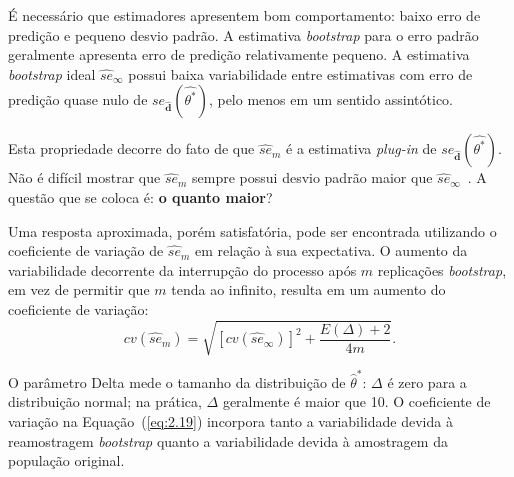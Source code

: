 

É necessário que estimadores apresentem bom comportamento: baixo erro de predição e pequeno desvio padrão. A estimativa \textit{bootstrap} para o erro padrão geralmente apresenta erro de predição relativamente pequeno. A estimativa \textit{bootstrap} ideal $\widehat{se}_{\infty}$ possui baixa variabilidade entre estimativas com erro de predição quase nulo de $se_{\widehat{\textbf{d}}}(\widehat{\theta^*})$, pelo menos em um sentido assintótico.

Esta propriedade decorre do fato de que $\widehat{se}_m$ é a estimativa \textit{plug-in} de $se_{\widehat{\textbf{d}}}(\widehat{\theta^*})$. Não é difícil mostrar que $\widehat{se}_m$ sempre possui desvio padrão maior que $\widehat{se}_{\infty}$~\cite{EFRON:1993}. A questão que se coloca é: \textbf{o quanto maior}?


Uma resposta aproximada, porém satisfatória, pode ser encontrada utilizando o coeficiente de variação de $\widehat{se}_{m}$ em relação à sua expectativa. O aumento da variabilidade decorrente da interrupção do processo após $m$ replicações \textit{bootstrap}, em vez de permitir que $m$ tenda ao infinito, resulta em um aumento do coeficiente de variação:
\begin{equation}
    cv(\widehat{se}_{m}) = \sqrt{[cv(\widehat{se}_\infty)]^2 + \frac{E(\Delta) + 2}{4m}}.
\label{eq:2.19}
\end{equation}

O parâmetro \gls{Delta} mede o tamanho da distribuição de $\widehat{\theta}^*$: $\Delta$ é zero para a distribuição normal; na prática, $\Delta$ geralmente é maior que 10. O coeficiente de variação na Equação~(\ref{eq:2.19}) incorpora tanto a variabilidade devida à reamostragem \textit{bootstrap} quanto a variabilidade devida à amostragem da população original.


